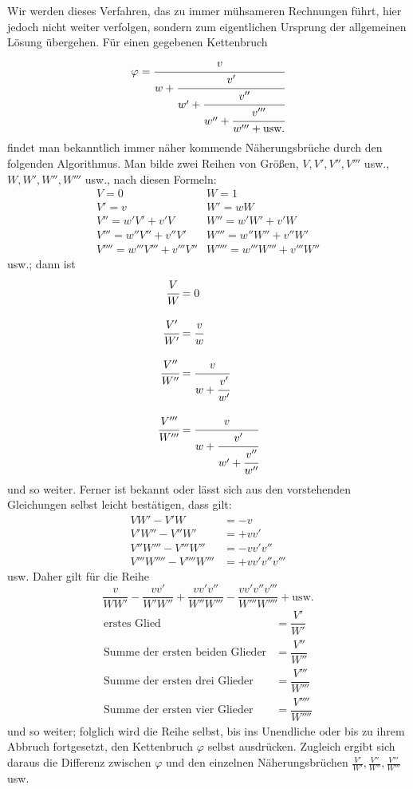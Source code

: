 Wir werden dieses Verfahren, das zu immer mühsameren Rechnungen führt, hier jedoch nicht weiter verfolgen, sondern zum eigentlichen Ursprung der allgemeinen Lösung übergehen.
Für einen gegebenen Kettenbruch
\[
\varphi=\cfrac{v}{w+\cfrac{v'}{w'+\cfrac{v''}{w''+\cfrac{v'''}{w'''+\text{usw.}}}}}
\]
findet man bekanntlich immer näher kommende Näherungsbrüche durch den folgenden Algorithmus. Man bilde zwei Reihen von Größen, $V,V',V'',V'''$ usw., $W,W',W'',W'''$ usw., nach diesen Formeln:
\[
\begin{array}{ll}
V=0&W=1\\[4pt]
V'=v&W'=wW\\[4pt]
V''=w'V'+v'V&W''=w'W'+v'W\\[4pt]
V'''=w''V''+v''V'&W'''=w''W''+v''W'\\[4pt]
V''''=w'''V'''+v'''V''&W''''=w'''W'''+v'''W''
\end{array}
\]
usw.; dann ist
\[
\begin{aligned}
\cfrac VW&=0\\[9pt]
\cfrac{V'}{W'}&=\cfrac vw\\[9pt]
\cfrac{V''}{W''}&=\cfrac v{w+\cfrac{v'}{w'}}\\[9pt]
\cfrac{V'''}{W'''}&=\cfrac v{w+\cfrac{v'}{w'+\cfrac{v''}{w''}}}
\end{aligned}
\]
und so weiter. Ferner ist bekannt oder lässt sich aus den vorstehenden Gleichungen selbst leicht bestätigen, dass gilt:
\[
\begin{aligned}
VW'-V'W&=-v\\
V'W''-V''W'&=+vv'\\
V''W'''-V'''W''&=-vv'v''\\
V'''W''''-V''''W'''&=+vv'v''v'''
\end{aligned}
\]
usw. Daher gilt für die Reihe
\[
\frac v{WW'}-\frac{vv'}{W'W''}+\frac{vv'v''}{W''W'''}-\frac{vv'v''v'''}{W'''W''''}+\text{usw.}
\]
\[
\begin{array}{ll}
\text{erstes Glied}&=\dfrac{V'}{W'}\\[10pt]
\text{Summe der ersten beiden Glieder}&=\dfrac{V''}{W''}\\[10pt]
\text{Summe der ersten drei Glieder}&=\dfrac{V'''}{W'''}\\[10pt]
\text{Summe der ersten vier Glieder}&=\dfrac{V''''}{W''''}
\end{array}
\]
und so weiter; folglich wird die Reihe selbst, bis ins Unendliche oder bis zu ihrem Abbruch fortgesetzt, den Kettenbruch $\varphi$ selbst ausdrücken. Zugleich ergibt sich daraus die Differenz zwischen $\varphi$ und den einzelnen Näherungsbrüchen $\frac{V'}{W'},\frac{V''}{W''},\frac{V'''}{W'''}$ usw.

